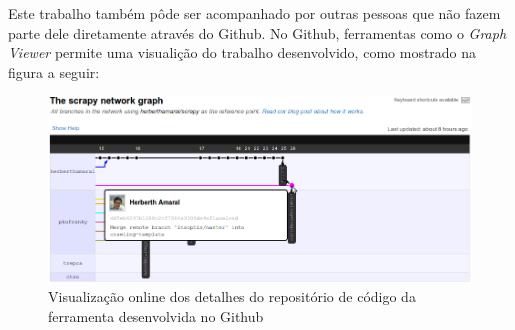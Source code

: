 \pagebreak
Este trabalho também pôde ser acompanhado por outras pessoas que não fazem parte dele diretamente através do Github. No Github, ferramentas como o \emph{Graph Viewer} permite uma visualição do trabalho desenvolvido, como mostrado na figura a seguir:

\begin{figure} [ht]
	\begin{center}
		\includegraphics[scale=0.5]{github.png}	
	\end{center}
	\caption{Visualização online dos detalhes do repositório de código da ferramenta desenvolvida no Github}
	\label{github}
\end{figure}

